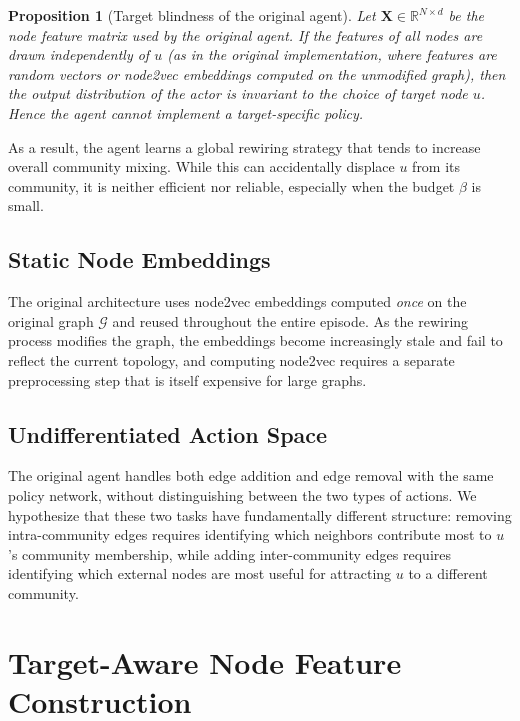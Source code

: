 \documentclass[11pt,a4paper,twoside]{tesis}
\newtheorem{proposition}{Proposition}[chapter]
\newcommand{\G}{\mathcal{G}}
\begin{document}
\begin{proposition}[Target blindness of the original agent]
Let $\mathbf{X} \in \mathbb{R}^{N \times d}$ be the node feature matrix used by the
original agent. If the features of all nodes are drawn independently of $u$ (as in the
original implementation, where features are random vectors or node2vec embeddings computed
on the unmodified graph), then the output distribution of the actor is invariant to the
choice of target node $u$. Hence the agent cannot implement a target-specific policy.
\end{proposition}

As a result, the agent learns a global rewiring strategy that tends to increase overall
community mixing. While this can accidentally displace $u$ from its community, it is
neither efficient nor reliable, especially when the budget $\beta$ is small.

\subsection{Static Node Embeddings}

The original architecture uses node2vec embeddings computed \emph{once} on the original
graph $\G$ and reused throughout the entire episode. As the rewiring process modifies
the graph, the embeddings become increasingly stale and fail to reflect the current
topology, and computing node2vec requires a separate preprocessing step that is itself
expensive for large graphs.

\subsection{Undifferentiated Action Space}

The original agent handles both edge addition and edge removal with the same policy
network, without distinguishing between the two types of actions. We hypothesize that
these two tasks have fundamentally different structure: removing intra-community edges
requires identifying which neighbors contribute most to $u$'s community membership,
while adding inter-community edges requires identifying which external nodes are most
useful for attracting $u$ to a different community.

\section{Target-Aware Node Feature Construction}
\label{sec:features}
\end{document}
